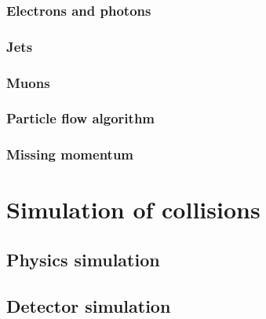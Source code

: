 \subsubsection{Electrons and photons}

\subsubsection{Jets}

\subsubsection{Muons}

\subsubsection{Particle flow algorithm}

\subsubsection{Missing momentum}

\section{Simulation of collisions}

\subsection{Physics simulation}

\subsection{Detector simulation}
